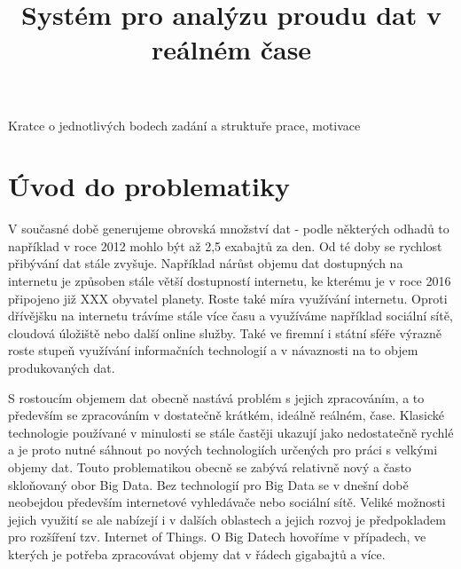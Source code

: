 \documentclass[thesis=B,czech]{FITthesis}[2012/06/26]
\title{Systém pro analýzu proudu dat v reálném čase}
\begin{document}

\begin{introduction}
	Kratce o jednotlivých bodech zadání a struktuře prace, motivace
	
\end{introduction}

%


\chapter{Úvod do problematiky}
	V současné době generujeme obrovská množství dat - podle některých odhadů to například v roce 2012 mohlo být až 2,5 exabajtů za den\cite{citace1}. Od té doby se rychlost přibývání dat stále zvyšuje. Například nárůst objemu dat dostupných na internetu je způsoben stále větší dostupností internetu, ke kterému je v roce 2016 připojeno již XXX obyvatel planety\cite{citace2}. Roste také míra využívání internetu. Oproti dřívějšku na internetu trávíme stále více času a využíváme například sociální sítě, cloudová úložiště nebo další online služby. Také ve firemní i státní sféře výrazně roste stupeň využívání informačních technologií a v návaznosti na to objem produkovaných dat. 

	S rostoucím objemem dat obecně nastává problém s jejich zpracováním, a to především se zpracováním v dostatečně krátkém, ideálně reálném, čase. Klasické technologie používané v minulosti se stále častěji ukazují jako nedostatečně rychlé a je proto nutné sáhnout po nových technologiích určených pro práci s velkými objemy dat. Touto problematikou obecně se zabývá relativně nový a často skloňovaný obor Big Data. Bez technologií pro Big Data se v dnešní době neobejdou především internetové vyhledávače nebo sociální sítě\cite{4}. Veliké možnosti jejich využití se ale nabízejí i v dalších oblastech a jejich rozvoj je předpokladem pro rozšíření tzv. Internet of Things\cite{3}. O Big Datech hovoříme v případech, ve kterých je potřeba zpracovávat objemy dat v řádech gigabajtů a více. 
	
\end{document}
